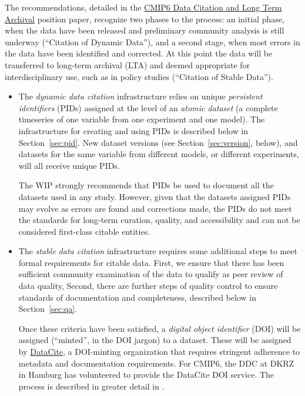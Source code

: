 \documentclass[gmd,manuscript]{copernicus}
\newcommand{\bibref}[1] { \cite{ref:#1}}
\newcommand{\secref}[1] {\mbox{Section  \ref{sec:#1}}}
\begin{document}
The recommendations, detailed in the
\href{https://goo.gl/BFn9Hq}{CMIP6 Data Citation and Long Term
  Archival} position paper, recognize two phases to the process: an
initial phase, when the data have been released and preliminary
community analysis is still underway (``Citation of Dynamic Data''),
and a second stage, when most errors in the data have been identified
and corrected. At this point the data will be transferred to long-term
archival (LTA) and deemed appropriate for interdisciplinary use, such
as in policy studies (``Citation of Stable Data'').

\begin{itemize}
\item The \emph{dynamic data citation} infrastructure relies on unique
  \emph{persistent identifiers} (PIDs) assigned at the level of an
  \emph{atomic dataset} (a complete timeseries of one variable from
  one experiment and one model). The infrastructure for creating and
  using PIDs is described below in \secref{pid}. New dataset versions
  (see \secref{version}, below), and datasets for the same variable
  from different models, or different experiments, will all receive
  unique PIDs.

  The WIP strongly recommends that PIDs be used to document all the
  datasets used in any study. However, given that the datasets assigned
  PIDs may evolve as errors are found and corrections made, the PIDs
  do not meet the standards for long-term curation, quality, and 
  accessibility and can not be considered first-class citable entities.
\item The \emph{stable data citation} infrastructure requires some
  additional steps to meet formal requirements for citable data. First, we
  ensure that there has been sufficient community examination of the
  data to qualify as peer review of data quality, Second, there are
  further steps of quality control to ensure standards of
  documentation and completeness, described below in \secref{qa}.

  Once these criteria have been satisfied, a \emph{digital object
    identifier} (DOI) will be assigned (``minted'', in the DOI jargon)
  to a dataset. These will be assigned by
  \href{https://www.datacite.org/dois.html}{DataCite}, a DOI-minting
  organization that requires stringent adherence to metadata and
  documentation requirements. For CMIP6, the DDC at DKRZ in Hamburg
  has volunteered to provide the DataCite DOI service. The process is
  described in greater detail in \bibref{stockhauselautenschlager2017}.


\end{itemize}
\end{document}
